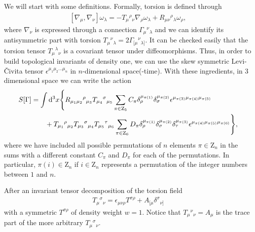 \documentclass[%
  showpacs,showkeys,prd,superscriptaddress]{revtex4-1}
\def\md{{\mathrm{d}}}
\def\l{\left}
\def\r{\right}
\def\lc{\left[}
\def\rc{\right]}
\begin{document}
We will start with some definitions.
Formally, torsion is defined through 
\begin{align}
  \label{curvdef}
  \lc \nabla_\mu,\nabla_\nu\rc \omega_\lambda=
  -T_\mu{}^\rho{}_\nu\nabla_\rho\omega_\lambda + R_{\mu\nu}{}^\rho{}_\lambda \omega _\rho,
\end{align}
where $\nabla_\nu$ is expressed through a connection 
$\Gamma_\mu{}^\nu{}_\lambda$ and we can identify its antisymmetric part with torsion $T_\mu{}^\nu{}_\lambda=2\Gamma_{[\mu}{}^\nu{}_{\lambda]}.$
It can be checked easily that the torsion tensor $T_\mu{}^\lambda{}_\nu$ 
is a covariant tensor under diffeomorphisms. Thus, in order to build
topological invariants of density one, we can use the skew symmetric 
Levi-\v{C}ivita tensor $\epsilon^{\mu_1\mu_2\dots\mu_n}$ in $n$-dimensional space(-time).
With these ingredients, in 3 dimensional space we can write the action 
\begin{align}
  \label{accion3d}
  S[\Gamma] &=
  \int\md^3x \Bigg\{R_{\mu_1\mu_2}{}^\rho{}_{\mu_3} T_{\mu_4}{}^\sigma{}_{\mu_5}\sum_{\pi \in \mathrm Z_5}C_\pi\delta_\rho^{\mu_{\pi(1)}} \delta_\sigma^{\mu_{\pi(2)}}\epsilon^{\mu_{\pi(3)}\mu_{\pi(4)}\mu_{\pi(5)}} \notag\\ 
  & \qquad + T_{\mu_1}{}^\rho{}_{\mu_2} T_{\mu_3}{}^\sigma{}_{\mu_4}T_{\mu_5}{}^\tau{}_{\mu_6} \sum_{\pi \in \mathrm Z_6}D_\pi\delta_\rho^{\mu_{\pi(1)}} \delta_\sigma^{\mu_{\pi(2)}}\delta_\tau^{\mu_{\pi(3)}}\epsilon^{\mu_{\pi(4)}\mu_{\pi(5)}\mu_{\pi(6)}}\Bigg\}, 
\end{align}
where we have included all possible permutations of $n$ elements $\pi\in\mathrm Z_n$ in the sums with a different constant $C_\pi$ and $D_\pi$ for each of the permutations. 
In particular, $\pi(i)\in\mathrm Z_n$ if $i\in\mathrm Z_n$ represents a permutation of the integer numbers between $1$ and $n$.

After an invariant tensor decomposition of the torsion field 
\begin{align}
  T_{\mu}{}^\sigma{}_{\nu}=\epsilon_{\mu\nu\rho} T^{\sigma\rho}+A_{[\mu}\delta^\sigma{}_{\nu]}
\end{align}
with a symmetric $T^{\sigma\rho}$ of density weight  $w =1$. Notice that $T_{\mu}{}^\nu{}_{\nu}=A_{\mu}$ is the trace part of the more arbitrary $T_{\mu}{}^\sigma{}_{\nu}$.
\end{document}
